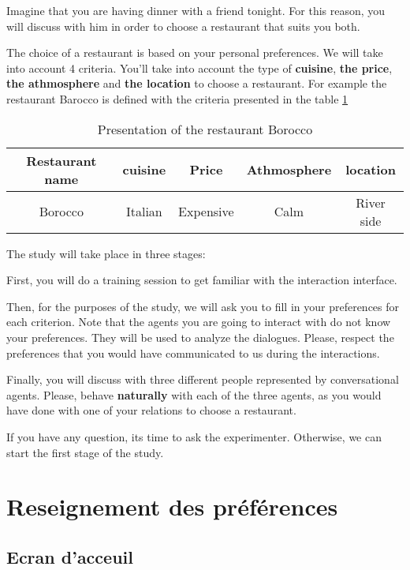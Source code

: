 \documentclass [french]{paper}
\begin{document}
			Imagine that you are having dinner with a friend tonight. For this reason, you will discuss with him in order to choose a restaurant that suits you both.
			
			The choice of a restaurant is based on your personal preferences. We will take into account 4 criteria. You'll take into account the type of \textbf {cuisine}, \textbf {the price}, \textbf {the athmosphere} and \textbf {the location} to choose a restaurant. For example the restaurant Barocco is defined with the criteria presented in the table \ref{teb:exEn}
			
				\begin{table}[h]
			\begin{tabular} {|c|c|c|c|c|}
				\hline
				Restaurant name & cuisine & Price & Athmosphere & location \\
				\hline
				Borocco & Italian & Expensive & Calm & River side \\
				\hline 
			\end{tabular}
			\label{teb:exEn}
			\caption{Presentation of the restaurant Borocco}
		\end{table}
		
		The study will take place in three stages:
		
		First, you will do a training session to get familiar with the interaction interface.
		
		Then, for the purposes of the study, we will ask you to fill in your preferences for each criterion.  Note that the agents you are going to interact with do not know your preferences. They will be used to analyze the dialogues. Please, respect the preferences that you would have communicated to us during the interactions.
	
		
		Finally, you will discuss with three different people represented by conversational agents. Please, behave \textbf{naturally} with each of the three agents, as you would have done with one of your relations to choose a restaurant.
	
		If you have any question, its time to ask the experimenter. Otherwise, we can start the first stage of the study.
	
		\section{Reseignement des préférences}
			\subsection{Ecran d'acceuil}
			
\end{document}
